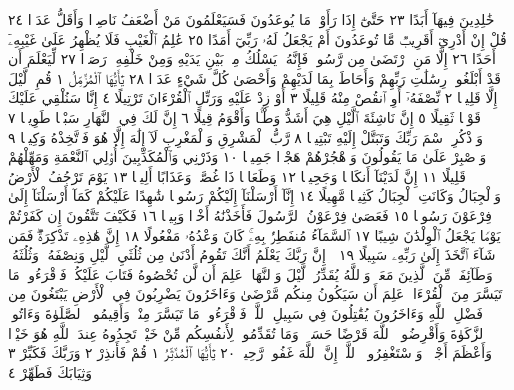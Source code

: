 خَٰلِدِينَ فِيهَآ أَبَدًا ٢٣ حَتَّىٰٓ إِذَا رَأَوْا۟ مَا يُوعَدُونَ فَسَيَعْلَمُونَ
مَنْ أَضْعَفُ نَاصِرࣰا وَأَقَلُّ عَدَدࣰا ٢٤ قُلْ إِنْ أَدْرِيٓ أَقَرِيبࣱ مَّا تُوعَدُونَ
أَمْ يَجْعَلُ لَهُۥ رَبِّيٓ أَمَدًا ٢٥ عَٰلِمُ ٱلْغَيْبِ فَلَا يُظْهِرُ عَلَىٰ غَيْبِهِۦٓ
أَحَدًا ٢٦ إِلَّا مَنِ ٱرْتَضَىٰ مِن رَّسُولࣲ فَإِنَّهُۥ يَسْلُكُ مِنۢ بَيْنِ
يَدَيْهِ وَمِنْ خَلْفِهِۦ رَصَدࣰا ٢٧ لِّيَعْلَمَ أَن قَدْ أَبْلَغُوا۟ رِسَٰلَٰتِ
رَبِّهِمْ وَأَحَاطَ بِمَا لَدَيْهِمْ وَأَحْصَىٰ كُلَّ شَيْءٍ عَدَدَۢا ٢٨
يَٰٓأَيُّهَا ٱلْمُزَّمِّلُ ١ قُمِ ٱلَّيْلَ إِلَّا قَلِيلࣰا ٢ نِّصْفَهُۥٓ أَوِ ٱنقُصْ مِنْهُ قَلِيلًا ٣
أَوْ زِدْ عَلَيْهِ وَرَتِّلِ ٱلْقُرْءَانَ تَرْتِيلًا ٤ إِنَّا سَنُلْقِي عَلَيْكَ قَوْلࣰا
ثَقِيلًا ٥ إِنَّ نَاشِئَةَ ٱلَّيْلِ هِيَ أَشَدُّ وَطْـࣰٔا وَأَقْوَمُ قِيلًا ٦ إِنَّ لَكَ فِي
ٱلنَّهَارِ سَبْحࣰا طَوِيلࣰا ٧ وَٱذْكُرِ ٱسْمَ رَبِّكَ وَتَبَتَّلْ إِلَيْهِ تَبْتِيلࣰا ٨
رَّبُّ ٱلْمَشْرِقِ وَٱلْمَغْرِبِ لَآ إِلَٰهَ إِلَّا هُوَ فَٱتَّخِذْهُ وَكِيلࣰا ٩ وَٱصْبِرْ
عَلَىٰ مَا يَقُولُونَ وَٱهْجُرْهُمْ هَجْرࣰا جَمِيلࣰا ١٠ وَذَرْنِي وَٱلْمُكَذِّبِينَ
أُو۟لِي ٱلنَّعْمَةِ وَمَهِّلْهُمْ قَلِيلًا ١١ إِنَّ لَدَيْنَآ أَنكَالࣰا وَجَحِيمࣰا ١٢
وَطَعَامࣰا ذَا غُصَّةࣲ وَعَذَابًا أَلِيمࣰا ١٣ يَوْمَ تَرْجُفُ ٱلْأَرْضُ وَٱلْجِبَالُ
وَكَانَتِ ٱلْجِبَالُ كَثِيبࣰا مَّهِيلًا ١٤ إِنَّآ أَرْسَلْنَآ إِلَيْكُمْ رَسُولࣰا شَٰهِدًا
عَلَيْكُمْ كَمَآ أَرْسَلْنَآ إِلَىٰ فِرْعَوْنَ رَسُولࣰا ١٥ فَعَصَىٰ فِرْعَوْنُ ٱلرَّسُولَ
فَأَخَذْنَٰهُ أَخْذࣰا وَبِيلࣰا ١٦ فَكَيْفَ تَتَّقُونَ إِن كَفَرْتُمْ يَوْمࣰا
يَجْعَلُ ٱلْوِلْدَٰنَ شِيبًا ١٧ ٱلسَّمَآءُ مُنفَطِرُۢ بِهِۦۚ كَانَ وَعْدُهُۥ مَفْعُولًا ١٨
إِنَّ هَٰذِهِۦ تَذْكِرَةࣱۖ فَمَن شَآءَ ٱتَّخَذَ إِلَىٰ رَبِّهِۦ سَبِيلًا ١٩
۞ إِنَّ رَبَّكَ يَعْلَمُ أَنَّكَ تَقُومُ أَدْنَىٰ مِن ثُلُثَيِ ٱلَّيْلِ وَنِصْفَهُۥ وَثُلُثَهُۥ وَطَآئِفَةࣱ
مِّنَ ٱلَّذِينَ مَعَكَۚ وَٱللَّهُ يُقَدِّرُ ٱلَّيْلَ وَٱلنَّهَارَۚ عَلِمَ أَن لَّن تُحْصُوهُ فَتَابَ
عَلَيْكُمْۖ فَٱقْرَءُوا۟ مَا تَيَسَّرَ مِنَ ٱلْقُرْءَانِۚ عَلِمَ أَن سَيَكُونُ مِنكُم مَّرْضَىٰ
وَءَاخَرُونَ يَضْرِبُونَ فِي ٱلْأَرْضِ يَبْتَغُونَ مِن فَضْلِ ٱللَّهِ وَءَاخَرُونَ
يُقَٰتِلُونَ فِي سَبِيلِ ٱللَّهِۖ فَٱقْرَءُوا۟ مَا تَيَسَّرَ مِنْهُۚ وَأَقِيمُوا۟ ٱلصَّلَوٰةَ وَءَاتُوا۟
ٱلزَّكَوٰةَ وَأَقْرِضُوا۟ ٱللَّهَ قَرْضًا حَسَنࣰاۚ وَمَا تُقَدِّمُوا۟ لِأَنفُسِكُم مِّنْ خَيْرࣲ تَجِدُوهُ
عِندَ ٱللَّهِ هُوَ خَيْرࣰا وَأَعْظَمَ أَجْرࣰاۚ وَٱسْتَغْفِرُوا۟ ٱللَّهَۖ إِنَّ ٱللَّهَ غَفُورࣱ رَّحِيمُۢ ٢٠
يَٰٓأَيُّهَا ٱلْمُدَّثِّرُ ١ قُمْ فَأَنذِرْ ٢ وَرَبَّكَ فَكَبِّرْ ٣ وَثِيَابَكَ فَطَهِّرْ ٤
